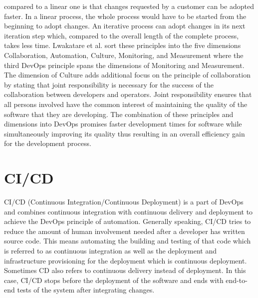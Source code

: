 compared to a linear one is that changes requested by a customer can be adopted faster.
In a linear process, the whole process would have to be started from the beginning to adopt changes.
An iterative process can adopt changes in its next iteration step which, compared
to the overall length of the complete process, takes less time.
Lwakatare et al. \cite{LK+16} sort these principles into the five dimensions
Collaboration, Automation, Culture, Monitoring, and Measurement where the third DevOps
principle spans the dimensions of Monitoring and Measurement. The dimension of
Culture adds additional focus on the principle of collaboration by stating that
joint responsibility is necessary for the success of the collaboration between
developers and operators. Joint responsibility ensures that all persons involved
have the common interest of maintaining the quality of the software that they are developing.
The combination of these principles and dimensions into DevOps promises faster
development times for software while simultaneously improving its quality thus
resulting in an overall efficiency gain for the development process.

\section{CI/CD}
\label{sec:foundation_cicd}

CI/CD (Continuous Integration/Continuous Deployment) is a part of DevOps
and combines continuous integration with continuous delivery and deployment to
achieve the DevOps principle of automation. Generally speaking,
CI/CD tries to reduce the amount of human involvement needed after a developer has written
source code. This means automating the building and testing of that code which is referred
to as continuous integration as well as the deployment and infrastructure provisioning
for the deployment which is continuous deployment. Sometimes CD also refers to
continuous delivery instead of deployment. In this case, CI/CD stops before the deployment
of the software and ends with end-to-end tests of the system after integrating changes.

